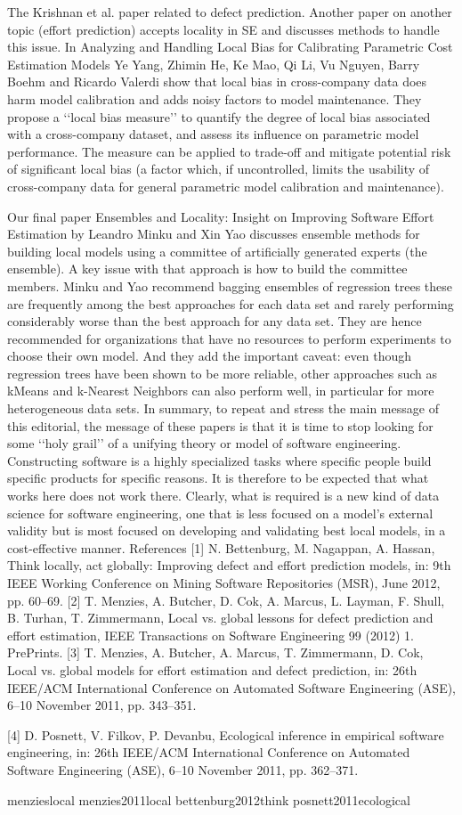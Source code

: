 The Krishnan et al. paper related to defect prediction. Another
paper on another topic (effort prediction) accepts locality in SE
and discusses methods to handle this issue. In Analyzing and
Handling Local Bias for Calibrating Parametric Cost Estimation Models
Ye Yang, Zhimin He, Ke Mao, Qi Li, Vu Nguyen, Barry Boehm and
Ricardo Valerdi show that local bias in cross-company data does
harm model calibration and adds noisy factors to model maintenance.
They propose a ‘‘local bias measure’’ to quantify the degree
of local bias associated with a cross-company dataset, and assess
its influence on parametric model performance. The measure can
be applied to trade-off and mitigate potential risk of significant local
bias (a factor which, if uncontrolled, limits the usability of
cross-company data for general parametric model calibration and
maintenance).

Our final paper Ensembles and Locality: Insight on Improving Software
Effort Estimation by Leandro Minku and Xin Yao discusses
ensemble methods for building local models using a committee
of artificially generated experts (the ensemble). A key issue with
that approach is how to build the committee members. Minku
and Yao recommend bagging ensembles of regression trees these
are frequently among the best approaches for each data set and
rarely performing considerably worse than the best approach for
any data set. They are hence recommended for organizations that
have no resources to perform experiments to choose their own
model. And they add the important caveat: even though regression
trees have been shown to be more reliable, other approaches such
as kMeans and k-Nearest Neighbors can also perform well, in particular
for more heterogeneous data sets.
In summary, to repeat and stress the main message of this editorial,
the message of these papers is that it is time to stop looking
for some ‘‘holy grail’’ of a unifying theory or model of software
engineering. Constructing software is a highly specialized tasks
where specific people build specific products for specific reasons.
It is therefore to be expected that what works here does not work
there. Clearly, what is required is a new kind of data science for
software engineering, one that is less focused on a model’s external
validity but is most focused on developing and validating best local
models, in a cost-effective manner.
References
[1] N. Bettenburg, M. Nagappan, A. Hassan, Think locally, act globally: Improving
defect and effort prediction models, in: 9th IEEE Working Conference on Mining
Software Repositories (MSR), June 2012, pp. 60–69.
[2] T. Menzies, A. Butcher, D. Cok, A. Marcus, L. Layman, F. Shull, B. Turhan, T.
Zimmermann, Local vs. global lessons for defect prediction and
effort estimation, IEEE Transactions on Software Engineering 99 (2012) 1.
PrePrints.
[3] T. Menzies, A. Butcher, A. Marcus, T. Zimmermann, D. Cok, Local vs. global
models for effort estimation and defect prediction, in: 26th IEEE/ACM
International Conference on Automated Software Engineering (ASE), 6–10
November 2011, pp. 343–351.

[4] D. Posnett, V. Filkov, P. Devanbu, Ecological inference in empirical software
engineering, in: 26th IEEE/ACM International Conference on Automated
Software Engineering (ASE), 6–10 November 2011, pp. 362–371.

menzieslocal
menzies2011local
bettenburg2012think
posnett2011ecological